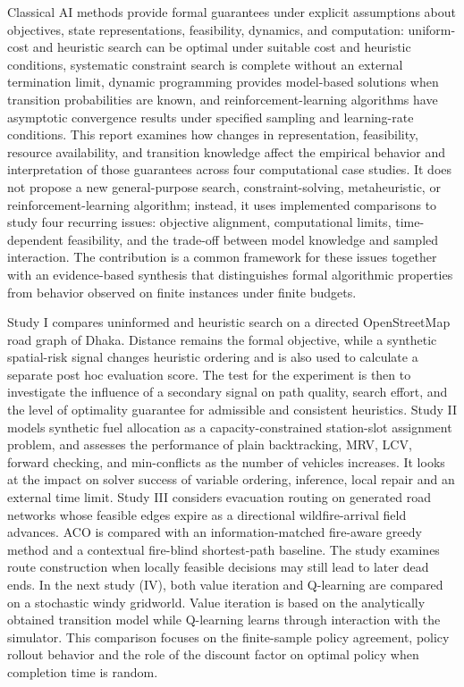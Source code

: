 \documentclass{ai-lab-report}
\begin{document}
Classical AI methods provide formal guarantees under explicit assumptions about objectives, state representations, feasibility, dynamics, and computation: uniform-cost and heuristic search can be optimal under suitable cost and heuristic conditions, systematic constraint search is complete without an external termination limit, dynamic programming provides model-based solutions when transition probabilities are known, and reinforcement-learning algorithms have asymptotic convergence results under specified sampling and learning-rate conditions. This report examines how changes in representation, feasibility, resource availability, and transition knowledge affect the empirical behavior and interpretation of those guarantees across four computational case studies. It does not propose a new general-purpose search, constraint-solving, metaheuristic, or reinforcement-learning algorithm; instead, it uses implemented comparisons to study four recurring issues: objective alignment, computational limits, time-dependent feasibility, and the trade-off between model knowledge and sampled interaction. The contribution is a common framework for these issues together with an evidence-based synthesis that distinguishes formal algorithmic properties from behavior observed on finite instances under finite budgets.

Study I compares uninformed and heuristic search on a directed OpenStreetMap road graph of Dhaka. Distance remains the formal objective, while a synthetic spatial-risk signal changes heuristic ordering and is also used to calculate a separate post hoc evaluation score. The test for the experiment is then to investigate the influence of a secondary signal on path quality, search effort, and the level of optimality guarantee for admissible and consistent heuristics. Study II models synthetic fuel allocation as a capacity-constrained station-slot assignment problem, and assesses the performance of plain backtracking, MRV, LCV, forward checking, and min-conflicts as the number of vehicles increases. It looks at the impact on solver success of variable ordering, inference, local repair and an external time limit. Study III considers evacuation routing on generated road networks whose feasible edges expire as a directional wildfire-arrival field advances. ACO is compared with an information-matched fire-aware greedy method and a contextual fire-blind shortest-path baseline. The study examines route construction when locally feasible decisions may still lead to later dead ends. In the next study (IV), both value iteration and Q-learning are compared on a stochastic windy gridworld. Value iteration is based on the analytically obtained transition model while Q-learning learns through interaction with the simulator. This comparison focuses on the finite-sample policy agreement, policy rollout behavior and the role of the discount factor on optimal policy when completion time is random.
\end{document}

